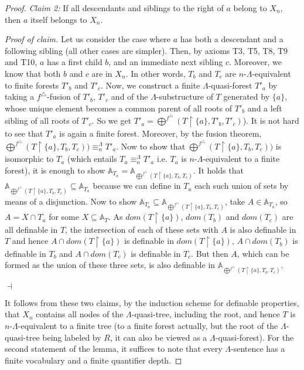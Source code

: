 \documentclass{LMCS}
\newenvironment{proofofclaim}{\begin{trivlist}\item\textit{Proof of claim.}}{\hfill$\dashv$\end{trivlist}}
\begin{document}
\begin{proof}
  \smallskip\par\noindent\emph{Claim 2:} If all descendants and siblings
  to the right of $a$ belong to $X_n$, then $a$ itself
  belongs to $X_n$.

  \begin{proofofclaim}
    Let us consider the case where $a$ has both a
    descendant and a following sibling (all other cases are
    simpler). Then, by axioms T3, T5, T8, T9 and T10, $a$ has a first child $b$, and
    an immediate next sibling $c$. Moreover, we know that both $b$ and
    $c$ are in $X_n$. In other words, $T_b$ and $T_c$ are
    $n$-$\Lambda$-equivalent to finite forests $T'_b$ and $T'_c$. Now, we
    construct a finite $\Lambda$-quasi-forest $T'_a$ by taking a $f^\triangle$-fusion of $T'_b$, $T'_c$ and of the $\Lambda$-substructure of $T$ generated by $\{a\}$, whose unique element becomes a
    common parent of all roots of $T'_b$ and a left sibling of all
    roots of $T'_c$. So we get $T'_a = \bigoplus^{f^\triangle}(T \upharpoonright \{a\},T'_b,T'_c)$).
    It is not hard to see that $T'_a$ is again a finite
    forest. Moreover, by the fusion theorem,
    $\bigoplus^{f^\triangle}(T \upharpoonright \{a\},T_b,T_c)) \equiv_n^\Lambda
    T'_a$.
    Now to show that $\bigoplus^{f^\triangle}(T \upharpoonright
    \{a\},T_b,T_c))$ is isomorphic to $T_a$ (which entails $T_a \equiv_n^\Lambda T'_a$ i.e. $T_a$ is $n$-$\Lambda$-equivalent to a finite forest),
    it is enough to show $\mathbb{A}_{T_a}=\mathbb{A}_{\bigoplus^{f^\triangle}(T \upharpoonright \{a\},
    T_b,T_c)}$. It holds that $\mathbb{A}_{\bigoplus^{f^\triangle}(T \upharpoonright \{a\},
    T_b,T_c)} \subseteq \mathbb{A}_{T_a}$ because we can define in $T_a$ each such union of sets by means
    of a disjunction. Now to show $\mathbb{A}_{T_a} \subseteq \mathbb{A}_{\bigoplus^{f^\triangle}(T\upharpoonright \{a\},
    T_b,T_c)}$, take $A \in \mathbb{A}_{T_a}$, so $A=X \cap T_a$ for some $X \subseteq \mathbb{A}_T$. As $dom(T\upharpoonright \{a\})$,
    $dom(T_b)$ and $dom(T_c)$ are all definable in $T$, the intersection of each of these sets with $A$ is also definable in $T$ and hence 
    $A \cap dom(T\upharpoonright \{a\})$ is definable in $dom(T\upharpoonright \{a\})$, $A \cap dom(T_b)$ is definable in $T_b$ and 
    $A \cap dom(T_c)$ is definable in $T_c$. But then $A$, which can be formed as the union of these three sets, is also definable in $\mathbb{A}_{\bigoplus^{f^\triangle}(T\upharpoonright \{a\},
    T_b,T_c)}$.
    
    \end{proofofclaim}

  It follows from these two claims, by the induction scheme for
  definable properties, that $X_n$ contains all nodes of the $\Lambda$-quasi-tree,
  including the root, and hence $T$ is $n$-$\Lambda$-equivalent to a finite
  tree (to a finite forest actually, but the root of the $\Lambda$-quasi-tree being labeled by $R$, it can also be viewed as a  $\Lambda$-quasi-forest).
  For the second statement of the lemma, it suffices to
  note that every $\Lambda$-sentence has a finite vocabulary and a finite
  quantifier depth.
\end{proof}
\end{document}
